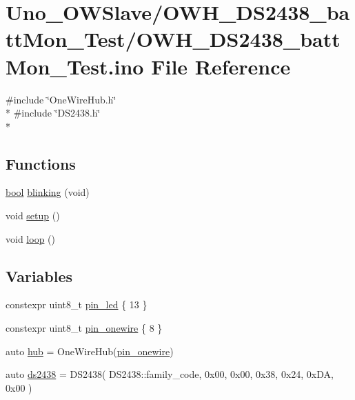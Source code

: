 \hypertarget{OWH__DS2438__battMon__Test_8ino}{\section{Uno\-\_\-\-O\-W\-Slave/\-O\-W\-H\-\_\-\-D\-S2438\-\_\-batt\-Mon\-\_\-\-Test/\-O\-W\-H\-\_\-\-D\-S2438\-\_\-batt\-Mon\-\_\-\-Test.ino File Reference}
\label{OWH__DS2438__battMon__Test_8ino}
}
{\ttfamily \#include \char`\"{}One\-Wire\-Hub.\-h\char`\"{}}\\*
{\ttfamily \#include \char`\"{}D\-S2438.\-h\char`\"{}}\\*
\subsection*{Functions}
\begin{DoxyCompactItemize}
\item 
\hyperlink{stdbool_8h_abb452686968e48b67397da5f97445f5b}{bool} \hyperlink{OWH__DS2438__battMon__Test_8ino_a6766eee584b84ead350781efbabe36d7}{blinking} (void)
\item 
void \hyperlink{OWH__DS2438__battMon__Test_8ino_a4fc01d736fe50cf5b977f755b675f11d}{setup} ()
\item 
void \hyperlink{OWH__DS2438__battMon__Test_8ino_afe461d27b9c48d5921c00d521181f12f}{loop} ()
\end{DoxyCompactItemize}
\subsection*{Variables}
\begin{DoxyCompactItemize}
\item 
constexpr uint8\-\_\-t \hyperlink{OWH__DS2438__battMon__Test_8ino_add5a7eb759d22b21f8875663ed2c1528}{pin\-\_\-led} \{ 13 \}
\item 
constexpr uint8\-\_\-t \hyperlink{OWH__DS2438__battMon__Test_8ino_ad4f51a015485d98cc3a8a79f41a81027}{pin\-\_\-onewire} \{ 8 \}
\item 
auto \hyperlink{OWH__DS2438__battMon__Test_8ino_a3beb275f1ae5db0a79499403dd2fbff8}{hub} = One\-Wire\-Hub(\hyperlink{OWH__DS2438__battMon__Test_8ino_ad4f51a015485d98cc3a8a79f41a81027}{pin\-\_\-onewire})
\item 
auto \hyperlink{OWH__DS2438__battMon__Test_8ino_ab30c05f5b0dc2426f77bf9e5e1de8508}{ds2438} = D\-S2438( D\-S2438\-::family\-\_\-code, 0x00, 0x00, 0x38, 0x24, 0x\-D\-A, 0x00 )
\end{DoxyCompactItemize}


